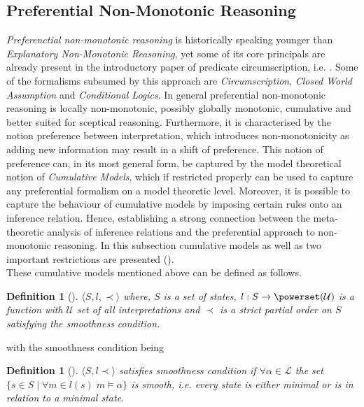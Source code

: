 \documentclass{extarticle}
\newtheorem{mydef}[thm]{Definition}
\begin{document}
\subsection{Preferential Non-Monotonic Reasoning}
\emph{Preferenctial non-monotonic reasoning} is historically speaking younger than \emph{Explanatory Non-Monotonic Reasoning}, yet some of its core principals are already present in the introductory paper of predicate circumscription, i.e. \cite{mccarthy1981circumscription}. Some of the formalisms subsumed by this approach are \emph{Circumscription}, \emph{Closed World Assumption} and \emph{Conditional Logics}.
In general preferential non-monotonic reasoning is locally non-monotonic, possibly globally monotonic, cumulative and better suited for sceptical reasoning. 
Furthermore, it is characterised by the notion preference between interpretation, which introduces non-monotonicity as adding new information may result in a shift of preference. This notion of preference can, in its most general form, be captured by the model theoretical notion of \emph{Cumulative Models}, which if restricted properly can be used to capture any preferential formalism on a model theoretic level. Moreover, it is possible to capture the behaviour of cumulative models by imposing certain rules onto an inference relation. Hence, establishing a strong connection between the meta-theoretic analysis of inference relations and the preferential approach to non-monotonic reasoning. In this subsection cumulative models as well as two important restrictions are presented
(\cite{BOCHMAN2007557,brewka1997nonmonotonic, bochman2005explanatory, kraus1990nonmonotonic}). \\

These cumulative models mentioned above can be defined as follows.
\begin{mydef}[\cite{kraus1990nonmonotonic}]
$\langle S,l, \prec \rangle$ where, $S$ is a set of states, $l:S \to \powerset(\mathcal{U})$ is a function with $\mathcal{U}$ set of all interpretations and $\prec$ is a strict partial order on $S$ satisfying the smoothness condition.
\end{mydef} 

with the smoothness condition being 

\begin{mydef}[\cite{kraus1990nonmonotonic}]

$\langle S, l \prec \rangle$ satisfies smoothness condition if $\forall \alpha \in \mathcal{L}$ the set $ \{s \in S \mid \forall m \in l(s)  \; m \models \alpha\}$ is smooth, i.e. every state is either minimal or is in relation to a minimal state.
\end{mydef}
 
\end{document}
